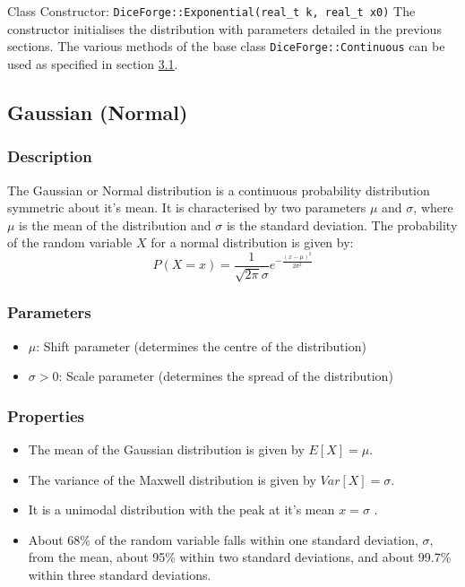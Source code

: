 \documentclass[titlepage, 11pt]{article}
\newcommand{\code}[1]
{\colorbox{light-gray}{\texttt{#1}}}
\begin{document}
Class Constructor:
\newline
\code{DiceForge::Exponential(real\_t k, real\_t x0)}
\newline
The constructor initialises the distribution with parameters detailed in the previous sections. The various methods of the base class \code{DiceForge::Continuous} can be used as specified in section \hyperref[sec:3.1]{3.1}.\newline

\subsection{Gaussian (Normal)}
\subsubsection{Description}
The Gaussian or Normal distribution is a continuous probability distribution symmetric about it's mean. It is characterised by two parameters $\mu$ and $\sigma$, where $\mu$ is the mean of the distribution and $\sigma$ is the standard deviation.
\newline
\newline
The probability of the random variable $X$ for a normal distribution is given by:
\begin{equation}
P(X = x) = \frac{1}{\sqrt{2\pi}\sigma} e^{-\frac{(x-\mu)^2}{2\sigma^2}}
\end{equation}

\subsubsection{Parameters}
\begin{itemize}
    \item $\mu$: Shift parameter (determines the centre of the distribution)
    \item $\sigma > 0$: Scale parameter (determines the spread of the distribution)
\end{itemize}
\subsubsection{Properties}
\begin{itemize}
    \item The mean of the Gaussian distribution is given by $E[X] = \mu$.
    \item The variance of the Maxwell distribution is given by $Var[X] = \sigma$.
    \item It is a unimodal distribution with the peak at it's mean $x =\sigma$ .
    \item About 68\% of the random variable falls within one standard deviation, $\sigma$, from the mean, about 95\% within two standard deviations, and about 99.7\% within three standard deviations.
\end{itemize}
\end{document}
